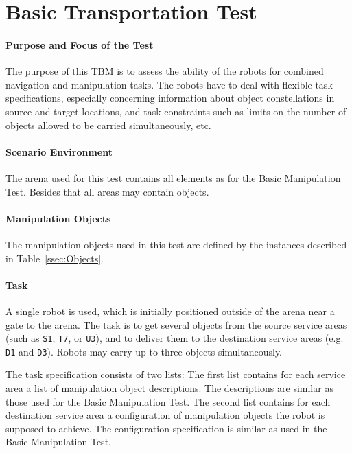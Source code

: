 \newpage
\section{Basic Transportation Test}

\paragraph{Purpose and Focus of the Test}
The purpose of this TBM is to assess the ability of the robots for combined navigation and manipulation tasks. 
The robots have to deal with flexible task specifications, especially concerning information about object constellations in source and target locations, and task constraints such as limits on the number of objects allowed to be carried simultaneously, etc.  

\paragraph{Scenario Environment}
The arena used for this test contains all elements as for the Basic Manipulation Test. Besides that all areas may contain objects.

\paragraph{Manipulation Objects}
The manipulation objects used in this test are defined by the instances described in Table~\ref{ssec:Objects}.

\paragraph{Task}
A single robot is used, which is initially positioned outside of the arena near a gate to the arena. The task is to get several objects from the source service areas (such as \texttt{S1}, \texttt{T7}, or \texttt{U3}), and to deliver them to the destination service areas (e.g. \texttt{D1} and \texttt{D3}). Robots may carry up to three objects simultaneously. 
\par
The task specification consists of two lists:
The first list contains for each service area a list of manipulation object descriptions. The descriptions are similar as those used for the Basic Manipulation Test. 
The second list contains for each destination service area a configuration of manipulation objects the robot is supposed to achieve. The configuration specification is similar as used in the Basic Manipulation Test. 

